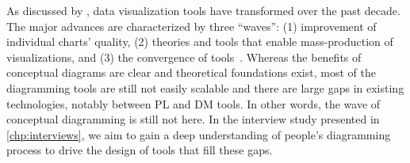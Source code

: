 As discussed by \citet{satyanarayan_critical_2020}, data visualization tools have transformed over the past decade. The major advances are characterized by three ``waves'': (1) improvement of individual charts' quality, (2) theories and tools that enable mass-production of visualizations, and (3) the convergence of tools~\cite{thirdWaveViz}. Whereas the benefits of conceptual diagrams are clear and theoretical foundations exist, most of the diagramming tools are still not easily scalable and there are large gaps in existing technologies, notably between PL and DM tools. In other words, the  wave of conceptual diagramming is still not here. In the interview study presented in \cref{chp:interviews}, we aim to gain a deep understanding of people's diagramming process to drive the design of tools that fill these gaps.






